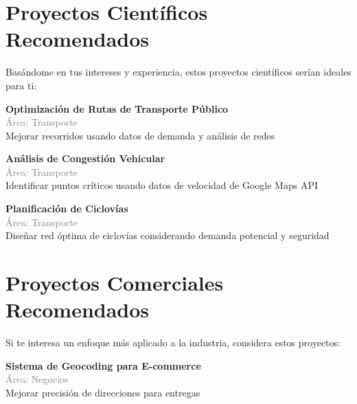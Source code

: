 \documentclass[11pt,a4paper]{article}
\begin{document}
\section*{ Proyectos Científicos Recomendados}

Basándome en tus intereses y experiencia, estos proyectos científicos serían ideales para ti:


\begin{tcolorbox}[colback=green!5,colframe=darkgreen,title={\small Proyecto Científico \#1}]
\textbf{Optimización de Rutas de Transporte Público}\\[0.2cm]
\textcolor{gray}{\small Área: Transporte}\\[0.2cm]
Mejorar recorridos usando datos de demanda y análisis de redes
\end{tcolorbox}


\begin{tcolorbox}[colback=green!5,colframe=darkgreen,title={\small Proyecto Científico \#2}]
\textbf{Análisis de Congestión Vehicular}\\[0.2cm]
\textcolor{gray}{\small Área: Transporte}\\[0.2cm]
Identificar puntos críticos usando datos de velocidad de Google Maps API
\end{tcolorbox}


\begin{tcolorbox}[colback=green!5,colframe=darkgreen,title={\small Proyecto Científico \#3}]
\textbf{Planificación de Ciclovías}\\[0.2cm]
\textcolor{gray}{\small Área: Transporte}\\[0.2cm]
Diseñar red óptima de ciclovías considerando demanda potencial y seguridad
\end{tcolorbox}


\section*{ Proyectos Comerciales Recomendados}

Si te interesa un enfoque más aplicado a la industria, considera estos proyectos:


\begin{tcolorbox}[colback=orange!5,colframe=darkorange,title={\small Proyecto Comercial \#1}]
\textbf{Sistema de Geocoding para E-commerce}\\[0.2cm]
\textcolor{gray}{\small Área: Negocios}\\[0.2cm]
Mejorar precisión de direcciones para entregas
\end{tcolorbox}
\end{document}
